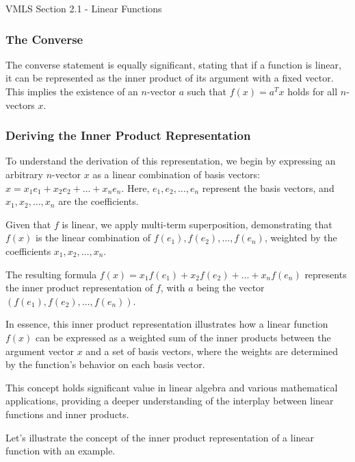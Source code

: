 \begin{notes}{VMLS Section 2.1 - Linear Functions}
    \subsubsection*{The Converse}
    
    The converse statement is equally significant, stating that if a function is linear, it can be represented as the inner product of its argument with a fixed vector. This implies the existence of an \(n\)-vector \(a\) such 
    that \(f(x) = a^T x\) holds for all \(n\)-vectors \(x\).
    
    \subsubsection*{Deriving the Inner Product Representation}
    
    To understand the derivation of this representation, we begin by expressing an arbitrary \(n\)-vector \(x\) as a linear combination of basis vectors: \(x = x_1e_1 + x_2e_2 + \ldots + x_ne_n\). Here, \(e_1, e_2, \ldots, e_n\) 
    represent the basis vectors, and \(x_1, x_2, \ldots, x_n\) are the coefficients.
    
    Given that \(f\) is linear, we apply multi-term superposition, demonstrating that \(f(x)\) is the linear combination of \(f(e_1), f(e_2), \ldots, f(e_n)\), weighted by the coefficients \(x_1, x_2, \ldots, x_n\).
    
    The resulting formula \(f(x) = x_1f(e_1) + x_2f(e_2) + \ldots + x_nf(e_n)\) represents the inner product representation of \(f\), with \(a\) being the vector \((f(e_1), f(e_2), \ldots, f(e_n))\).
    
    In essence, this inner product representation illustrates how a linear function \(f(x)\) can be expressed as a weighted sum of the inner products between the argument vector \(x\) and a set of basis vectors, where the weights 
    are determined by the function's behavior on each basis vector.
    
    This concept holds significant value in linear algebra and various mathematical applications, providing a deeper understanding of the interplay between linear functions and inner products.

    \begin{Highlight}
        Let's illustrate the concept of the inner product representation of a linear function with an example.
        
        

\end{Highlight}
\end{notes}
